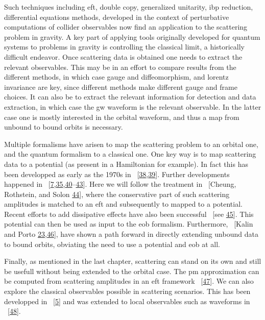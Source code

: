 \documentclass[
  11pt,
  a4paper,
  DIV=11,
  numbers=noendperiod,
  twoside]{scrreprt}
\DeclareRobustCommand{\[}{\begin{equation}}
\DeclareRobustCommand{\]}{\end{equation}}
\begin{document}
Such techniques including \gls{eft}, double copy, generalized unitarity,
\gls{ibp} reduction, differential equations methods, developed in the
context of perturbative computations of collider observables now find an
application to the scattering problem in gravity. A key part of applying
tools originally developed for quantum systems to problems in gravity is
controlling the classical limit, a historically difficult endeavor. Once
scattering data is obtained one needs to extract the relevant
observables. This may be in an effort to compare results from the
different methods, in which case gauge and diffeomorphism, and lorentz
invariance are key, since different methods make different gauge and
frame choices. It can also be to extract the relevant information for
detection and data extraction, in which case the \gls{gw} waveform is
the relevant observable. In the latter case one is mostly interested in
the orbital waveform, and thus a map from unbound to bound orbits is
necessary.

Multiple formalisms have arisen to map the scattering problem to an
orbital one, and the quantum formalism to a classical one. One key way
is to map scattering data to a potential (as present in a Hamiltonian
for example). In fact this has been developped as early as the 1970s in
~{[}\protect\hyperlink{ref-Hiida:1972xs}{38},\protect\hyperlink{ref-Iwasaki:1971vb}{39}{]}.
Further developments happened in
~{[}\protect\hyperlink{ref-Neill:2013wsa}{7},\protect\hyperlink{ref-Damour:2016gwp}{35},\protect\hyperlink{ref-Bjerrum-Bohr:2013bxa}{40}--\protect\hyperlink{ref-Guevara:2017csg}{43}{]}.
Here we will follow the treatment in ~{[}Cheung, Rothstein, and Solon
\protect\hyperlink{ref-Cheung:2018wkq}{44}{]}, where the conservative
part of such scattering amplitudes is matched to an \gls{eft} and
subsequently to mapped to a potential. Recent efforts to add dissipative
effects have also been successful ~{[}see
\protect\hyperlink{ref-Kalin:2022hph}{45}{]}. This potential can then be
used as input to the \gls{eob} formalism. Furthermore, ~{[}Kalin and
Porto
\protect\hyperlink{ref-Kalin:2019rwq}{23},\protect\hyperlink{ref-Kalin:2019inp}{46}{]},
have shown a path forward in directly extending unbound data to bound
orbits, obviating the need to use a potential and \gls{eob} at all.

Finally, as mentioned in the last chapter, scattering can stand on its
own and still be usefull without being extended to the orbital case. The
\gls{pm} approximation can be computed from scattering amplitudes in an
\gls{eft} framework ~{[}\protect\hyperlink{ref-Kalin:2020mvi}{47}{]}. We
can also explore the classical observables possible in scattering
scenarios. This has been developped in
~{[}\protect\hyperlink{ref-Kosower:2018adc}{5}{]} and was extended to
local observables such as waveforms in
~{[}\protect\hyperlink{ref-Cristofoli:2021vyo}{48}{]}.
\end{document}
